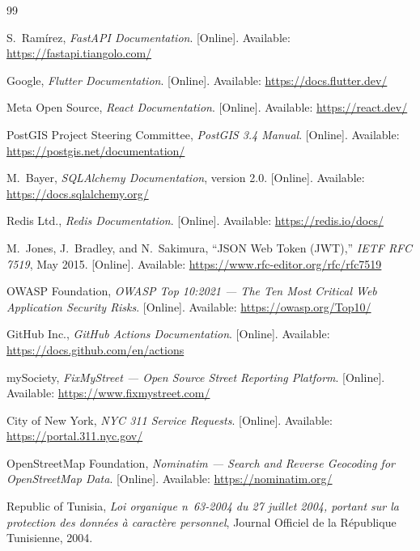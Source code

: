 \begin{thebibliography}{99}

S.\ Ramírez, \textit{FastAPI Documentation}. [Online]. Available: \url{https://fastapi.tiangolo.com/}

Google, \textit{Flutter Documentation}. [Online]. Available: \url{https://docs.flutter.dev/}

Meta Open Source, \textit{React Documentation}. [Online]. Available: \url{https://react.dev/}

PostGIS Project Steering Committee, \textit{PostGIS 3.4 Manual}. [Online]. Available: \url{https://postgis.net/documentation/}

M.\ Bayer, \textit{SQLAlchemy Documentation}, version 2.0. [Online]. Available: \url{https://docs.sqlalchemy.org/}

Redis Ltd., \textit{Redis Documentation}. [Online]. Available: \url{https://redis.io/docs/}

M.\ Jones, J.\ Bradley, and N.\ Sakimura, ``JSON Web Token (JWT),'' \textit{IETF RFC 7519}, May 2015. [Online]. Available: \url{https://www.rfc-editor.org/rfc/rfc7519}

OWASP Foundation, \textit{OWASP Top 10:2021 --- The Ten Most Critical Web Application Security Risks}. [Online]. Available: \url{https://owasp.org/Top10/}

GitHub Inc., \textit{GitHub Actions Documentation}. [Online]. Available: \url{https://docs.github.com/en/actions}

mySociety, \textit{FixMyStreet --- Open Source Street Reporting Platform}. [Online]. Available: \url{https://www.fixmystreet.com/}

City of New York, \textit{NYC 311 Service Requests}. [Online]. Available: \url{https://portal.311.nyc.gov/}

OpenStreetMap Foundation, \textit{Nominatim --- Search and Reverse Geocoding for OpenStreetMap Data}. [Online]. Available: \url{https://nominatim.org/}

Republic of Tunisia, \textit{Loi organique n\textdegree~63-2004 du 27 juillet 2004, portant sur la protection des données à caractère personnel}, Journal Officiel de la République Tunisienne, 2004.

\end{thebibliography}
